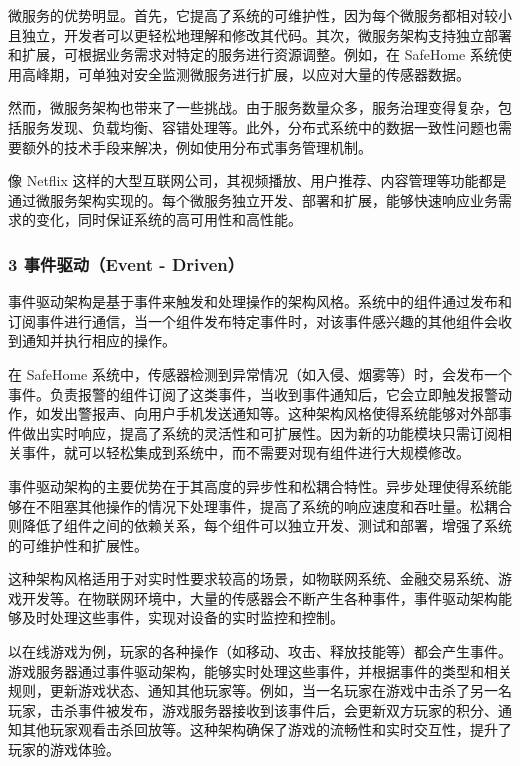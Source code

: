 
微服务的优势明显。首先，它提高了系统的可维护性，因为每个微服务都相对较小且独立，开发者可以更轻松地理解和修改其代码。其次，微服务架构支持独立部署和扩展，可根据业务需求对特定的服务进行资源调整。例如，在 SafeHome 系统使用高峰期，可单独对安全监测微服务进行扩展，以应对大量的传感器数据。

然而，微服务架构也带来了一些挑战。由于服务数量众多，服务治理变得复杂，包括服务发现、负载均衡、容错处理等。此外，分布式系统中的数据一致性问题也需要额外的技术手段来解决，例如使用分布式事务管理机制。


像 Netflix 这样的大型互联网公司，其视频播放、用户推荐、内容管理等功能都是通过微服务架构实现的。每个微服务独立开发、部署和扩展，能够快速响应业务需求的变化，同时保证系统的高可用性和高性能。

\hypertarget{ux4e8bux4ef6ux9a71ux52a8event---driven}{%
\subsubsection{3 事件驱动（Event - Driven）}\label{ux4e8bux4ef6ux9a71ux52a8event---driven}}


事件驱动架构是基于事件来触发和处理操作的架构风格。系统中的组件通过发布和订阅事件进行通信，当一个组件发布特定事件时，对该事件感兴趣的其他组件会收到通知并执行相应的操作。

在 SafeHome 系统中，传感器检测到异常情况（如入侵、烟雾等）时，会发布一个事件。负责报警的组件订阅了这类事件，当收到事件通知后，它会立即触发报警动作，如发出警报声、向用户手机发送通知等。这种架构风格使得系统能够对外部事件做出实时响应，提高了系统的灵活性和可扩展性。因为新的功能模块只需订阅相关事件，就可以轻松集成到系统中，而不需要对现有组件进行大规模修改。


事件驱动架构的主要优势在于其高度的异步性和松耦合特性。异步处理使得系统能够在不阻塞其他操作的情况下处理事件，提高了系统的响应速度和吞吐量。松耦合则降低了组件之间的依赖关系，每个组件可以独立开发、测试和部署，增强了系统的可维护性和扩展性。

这种架构风格适用于对实时性要求较高的场景，如物联网系统、金融交易系统、游戏开发等。在物联网环境中，大量的传感器会不断产生各种事件，事件驱动架构能够及时处理这些事件，实现对设备的实时监控和控制。


以在线游戏为例，玩家的各种操作（如移动、攻击、释放技能等）都会产生事件。游戏服务器通过事件驱动架构，能够实时处理这些事件，并根据事件的类型和相关规则，更新游戏状态、通知其他玩家等。例如，当一名玩家在游戏中击杀了另一名玩家，击杀事件被发布，游戏服务器接收到该事件后，会更新双方玩家的积分、通知其他玩家观看击杀回放等。这种架构确保了游戏的流畅性和实时交互性，提升了玩家的游戏体验。

